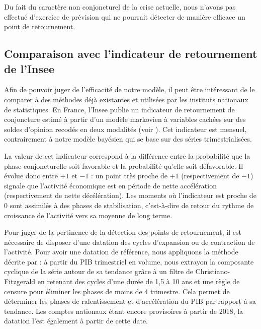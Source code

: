 \documentclass[10pt,french,french]{article}
\begin{document}
Du fait du caractère non conjoncturel de la crise actuelle, nous n'avons pas effectué d'exercice de prévision qui ne pourrait détecter de manière efficace un point de retournement.

\hypertarget{sec:indretFr}{%
\subsection{Comparaison avec l'indicateur de retournement de l'Insee}\label{sec:indretFr}}

Afin de pouvoir juger de l'efficacité de notre modèle, il peut être intéressant de le comparer à des méthodes déjà existantes et utilisées par les instituts nationaux de statistiques.
En France, l'Insee publie un indicateur de retournement de conjoncture estimé à partir d'un modèle markovien à variables cachées sur des soldes d'opinion recodés en deux modalités (voir \cite{indretFR}).
Cet indicateur est mensuel, contrairement à notre modèle bayésien qui se base sur des séries trimestrialisées.

La valeur de cet indicateur correspond à la différence entre la probabilité que la phase conjoncturelle soit favorable et la probabilité qu'elle soit défavorable.
Il évolue donc entre \(+1\) et \(-1\) : un point très proche de \(+1\) (respectivement de \(-1\)) signale que l'activité économique est en période de nette accélération (respectivement de nette décélération).
Les moments où l'indicateur est proche de 0 sont assimilés à des phases de stabilisation, c'est-à-dire de retour du rythme de croissance de l'activité vers sa moyenne de long terme.

Pour juger de la pertinence de la détection des points de retournement, il est nécessaire de disposer d'une datation des cycles d'expansion ou de contraction de l'activité.
Pour avoir une datation de référence, nous appliquons la méthode décrite par \cite{bardaji} : à partir du PIB trimestriel en volume, nous extrayon la composante cyclique de la série autour de sa tendance grâce à un filtre de Christiano-Fitzgerald en retenant des cycles d'une durée de 1,5 à 10 ans et une règle de censure pour éliminer les phases de moins de 4 trimestre.
Cela permet de déterminer les phases de ralentissement et d'accélération du PIB par rapport à sa tendance.
Les comptes nationaux étant encore provisoires à partir de 2018, la datation l'est également à partir de cette date.
\end{document}
